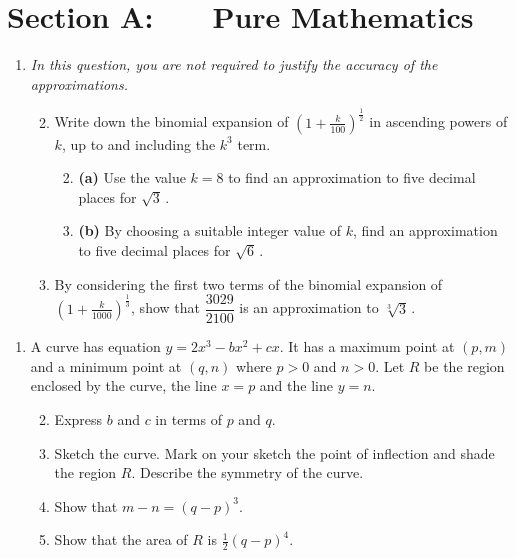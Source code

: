 \documentclass[a4, 11pt]{report}
\newlength{\qspace}
\newcounter{qnumber}
\newenvironment{question}%
 {\vspace{\qspace}
  \begin{enumerate}[\bfseries 1\quad][10]%
    \setcounter{enumi}{\value{qnumber}}%
    \item%
 }
{
  \end{enumerate}
  \filbreak
  \stepcounter{qnumber}
 }
\newenvironment{questionparts}[1][1]%
 {
  \begin{enumerate}[\bfseries (i)]%
    \setcounter{enumii}{#1}
    \addtocounter{enumii}{-1}
    \setlength{\itemsep}{5mm}
    \setlength{\parskip}{8pt}
 }
 {
  \end{enumerate}
 }
\newcommand{\ds}{\displaystyle}
\begin{document}
\setcounter{page}{2}

 
\section*{Section A: \ \ \ Pure Mathematics}

\begin{question}
{\sl In this question, 
you are not required to  justify the accuracy of the approximations.}

\begin{questionparts}
\item Write down the binomial expansion of 
$\ds \left( 1+\frac k {100} \right)^{\!\frac12}$
in ascending powers of $k$, up to and including the
$k^3$ term.

\begin{questionparts}
\item[\bf {(a)}]
Use  the value $k=8$ to find an approximation to five decimal
  places
for $\sqrt{3}\,$.

\item[\bf {(b)}] By choosing a suitable integer value of $k$,
find an approximation to five decimal places for $\sqrt6\,$.
\end{questionparts}
\item
By considering the first two terms of the binomial expansion of 
$\ds \left( 1+\frac k {1000} \right)^{\!\frac13}$, show that
$\dfrac{3029}{2100}$ is an approximation to $\sqrt[3]{3}\,$.
\end{questionparts}
\end{question}

\begin{question}
A curve has equation $y=2x^3-bx^2+cx$. It  has a
maximum point at $(p,m)$ and a minimum point at $(q,n)$ where $p>0$ and $n>0$.
Let $R$ be the 
 region enclosed by the curve, the line $x=p$ and the line 
$y=n$.
\begin{questionparts}
\item Express $b$ and $c$ in terms of $p$ and $q$.
\item Sketch the curve. Mark on your sketch the point of inflection
  and shade the region $R$. Describe the symmetry of the curve.
\item  Show that $m-n=(q-p)^3$.
\item  Show that the area of $R$ is $\frac12 (q-p)^4$.
\end{questionparts}
\end{question}
\end{document}
